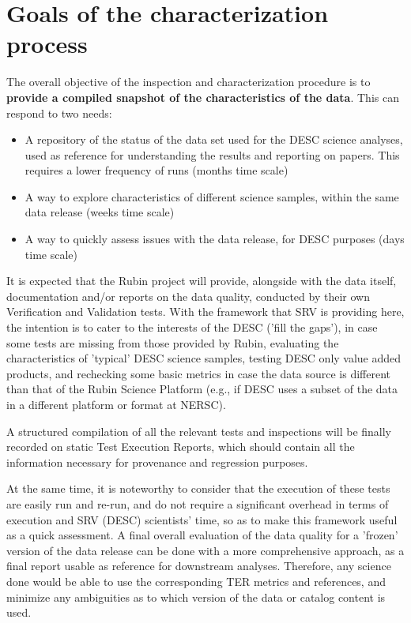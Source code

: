 \documentclass[12pt, a4paper]{article}
\begin{document}
\section{Goals of the characterization process}

The overall objective of the inspection and characterization procedure is to \textbf{provide a compiled snapshot of the characteristics of the data}. This can respond to two needs:

\begin{itemize}
	\item A repository of the status of the data set used for the DESC science analyses, used as reference for understanding the results and reporting on papers. This requires a lower frequency of runs (months time scale)
	\item A way to explore characteristics of different science samples, within the same data release (weeks time scale)
	\item A way to quickly assess issues with the data release, for DESC purposes (days time scale)
\end{itemize}

It is expected that the Rubin project will provide, alongside with the data itself, documentation and/or reports on the data quality, conducted by their own Verification and Validation tests. With the framework that SRV is providing here, the intention is to cater to the interests of the DESC ('fill the gaps'), in case some tests are missing from those provided by Rubin, evaluating the characteristics of 'typical' DESC science samples, testing DESC only value added products, and rechecking some basic metrics in case the data source is different than that of the Rubin Science Platform (e.g., if DESC uses a subset of the data in a different platform or format at NERSC).

A structured compilation of all the relevant tests and inspections will be finally recorded on static Test Execution Reports, which should contain all the information necessary for provenance and regression purposes.

At the same time, it is noteworthy to consider that the execution of these tests are easily run and re-run, and do not require a significant overhead in terms of execution and SRV (DESC) scientists' time, so as to make this framework useful as a quick assessment. A final overall evaluation of the data quality for a 'frozen' version of the data release can be done with a more comprehensive approach, as a final report usable as reference for downstream analyses. Therefore, any science done would be able to use the corresponding TER metrics and references, and minimize any ambiguities as to which version of the data or catalog content is used.
\end{document}
